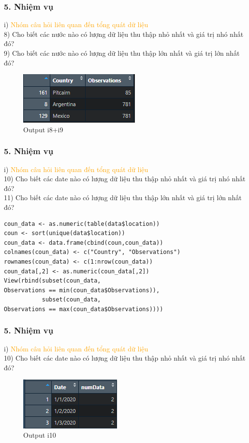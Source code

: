 \documentclass[english,10pt,table]{beamer}
\begin{document}
\begin{frame}[fragile]
\frametitle{5.  Nhiệm vụ}
	i) \textcolor{orange}{Nhóm câu hỏi liên quan đến tổng quát dữ liệu}\\
	8) Cho biết các nước nào có lượng dữ liệu thu thập nhỏ nhất và giá trị nhó nhất đó?\\
	9) Cho biết các nước nào có lượng dữ liệu thu thập lớn nhất và giá trị lớn nhất đó?
\begin{figure}[h!]
	\begin{center}
		    \includegraphics[scale = 1]{Images/I/I8+9.png}
		            \caption{Output i8+i9}
		\end{center}
		\end{figure}
\end{frame}

\begin{frame}[fragile]
\frametitle{5.  Nhiệm vụ}
	i) \textcolor{orange}{Nhóm câu hỏi liên quan đến tổng quát dữ liệu}\\
	10) Cho biết các date nào có lượng dữ liệu thu thập nhỏ nhất và giá trị nhó nhất đó?\\
	11) Cho biết các date nào có lượng dữ liệu thu thập lớn nhất và giá trị lớn nhất đó?
		\begin{lstlisting}[frame=single]  
coun_data <- as.numeric(table(data$location))
coun <- sort(unique(data$location))
coun_data <- data.frame(cbind(coun,coun_data))
colnames(coun_data) <- c("Country", "Observations")
rownames(coun_data) <- c(1:nrow(coun_data))
coun_data[,2] <- as.numeric(coun_data[,2])
View(rbind(subset(coun_data, 
Observations == min(coun_data$Observations)),
           subset(coun_data, 
Observations == max(coun_data$Observations))))
	\end{lstlisting}
\end{frame}

\begin{frame}[fragile]
\frametitle{5.  Nhiệm vụ}
	i) \textcolor{orange}{Nhóm câu hỏi liên quan đến tổng quát dữ liệu}\\
	10) Cho biết các date nào có lượng dữ liệu thu thập nhỏ nhất và giá trị nhó nhất đó?
\begin{figure}[h!]
	\begin{center}
		    \includegraphics[scale = 1]{Images/I/I10.png}
		            \caption{Output i10}
		\end{center}
		\end{figure}
\end{frame}
\end{document}
